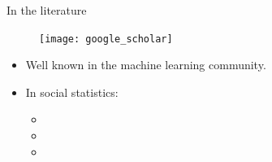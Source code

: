 %

\begin{frame}{In the literature}
  \vspace{-15pt}
  \begin{figure}[h]
    \texttt{[image: google\_scholar]}
  \end{figure}
  \vspace{-15pt}
  \begin{itemize}
    \item Well known in the machine learning community.
    \item In social statistics:
    \begin{itemize}\footnotesize
      \item {}
      \item {}
      \item {}
    \end{itemize}
  \end{itemize}
\end{frame}

